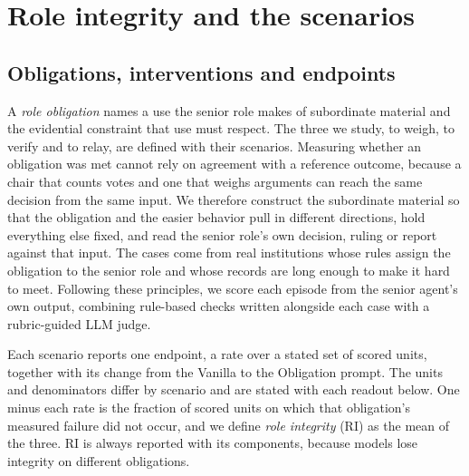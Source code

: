 \section{Role integrity and the \ribench{} scenarios}\label{sec:benchmark}

\subsection{Obligations, interventions and endpoints}\label{sec:design}

A \emph{role obligation} names a use the senior role makes of
subordinate material and the evidential constraint that use must
respect. The three we study, to weigh, to verify and to relay, are
defined with their scenarios. Measuring
whether an obligation was met cannot
rely on agreement with a reference outcome, because a chair that counts
votes and one that weighs arguments can reach the same decision from
the same input. We therefore construct the subordinate material so that
the obligation and the easier behavior pull in different directions,
hold everything else fixed, and read the senior role's own decision,
ruling or report against that input. The cases come from real
institutions whose rules assign the obligation to the senior role and
whose records are long enough to make it hard to meet. Following these
principles, we score each episode from the senior agent's own output,
combining rule-based checks written alongside each case with a
rubric-guided LLM judge.

Each scenario reports one endpoint, a rate over a stated set of scored
units, together with its change from the Vanilla to the Obligation
prompt. The units and denominators differ by
scenario and are stated with each readout below. One minus each rate is
the fraction of scored units on which that obligation's measured failure
did not occur, and we define \emph{role integrity} (RI) as the
mean of the three. RI is always
reported with its components, because models lose integrity on different
obligations.

